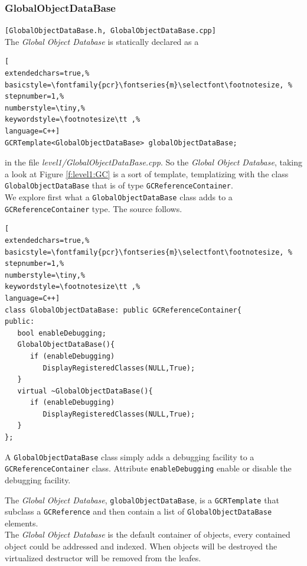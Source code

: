 \subsubsection{GlobalObjectDataBase}
\texttt{[GlobalObjectDataBase.h, GlobalObjectDataBase.cpp]}\\

The \textit{Global Object Database} is statically declared as a
\begin{lstlisting}[
extendedchars=true,%
basicstyle=\fontfamily{pcr}\fontseries{m}\selectfont\footnotesize, %
stepnumber=1,%
numberstyle=\tiny,%
keywordstyle=\footnotesize\tt ,%
language=C++]
GCRTemplate<GlobalObjectDataBase> globalObjectDataBase;
\end{lstlisting}

in the file \textit{level1/GlobalObjectDataBase.cpp}. So the \textit{Global Object Database}, taking a look at Figure \ref{f:level1:GC} is a sort of template, templatizing with the class \texttt{GlobalObjectDataBase} that is of type \texttt{GCReferenceContainer}.\\


We explore first what a \texttt{GlobalObjectDataBase} class adds to a \texttt{GCReferenceContainer} type. The source follows.
\begin{lstlisting}[
extendedchars=true,%
basicstyle=\fontfamily{pcr}\fontseries{m}\selectfont\footnotesize, %
stepnumber=1,%
numberstyle=\tiny,%
keywordstyle=\footnotesize\tt ,%
language=C++]
class GlobalObjectDataBase: public GCReferenceContainer{
public:
   bool enableDebugging;
   GlobalObjectDataBase(){
      if (enableDebugging)
         DisplayRegisteredClasses(NULL,True);
   }
   virtual ~GlobalObjectDataBase(){
      if (enableDebugging)
         DisplayRegisteredClasses(NULL,True);
   }
};
\end{lstlisting}

A \texttt{GlobalObjectDataBase} class simply adds a debugging facility to a \texttt{GCReferenceContainer} class. Attribute \texttt{enableDebugging} enable or disable the debugging facility.

The \textit{Global Object Database}, \texttt{globalObjectDataBase}, is a \texttt{GCRTemplate} that subclass a \texttt{GCReference} and then contain a list of \texttt{GlobalObjectDataBase} elements.\\


The \textit{Global Object Database} is the default container of objects, every contained object could be addressed and indexed. When objects will be destroyed the virtualized destructor will be removed from the leafes.

